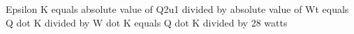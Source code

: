 Epsilon K equals absolute value of Q2u1 divided by absolute value of Wt equals Q dot K divided by W dot K equals Q dot K divided by 28 watts
